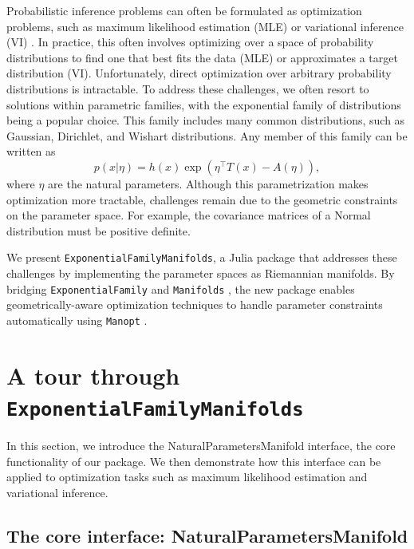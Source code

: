 \documentclass{juliacon}
\newcommand{\dmitry}[2][] {\todo[inline,backgroundcolor=teal!20!white, #1]{(dmitry) #2}}
\newcommand{\code}[1]{\textsf{#1}}
\begin{document}
Probabilistic inference problems can often be formulated as optimization problems, such as maximum likelihood estimation (MLE) or variational inference (VI) \cite{blei_variational_2017}. In practice, this often involves optimizing over a space of probability distributions to find one that best fits the data (MLE) or approximates a target distribution (VI). Unfortunately, direct optimization over arbitrary probability distributions is intractable. To address these challenges, we often resort to solutions within parametric families, with the exponential family of distributions being a popular choice. This family includes many common distributions, such as Gaussian, Dirichlet, and Wishart distributions. Any member of this family can be written as
\begin{equation*}\label{eq:exponential-family}
p(x|\eta) = h(x)\exp\left(\eta^\top T(x) - A(\eta)\right),
\end{equation*}
where $\eta$ are the natural parameters. Although this parametrization makes optimization more tractable, challenges remain due to the geometric constraints on the parameter space. For example, the covariance matrices of a Normal distribution must be positive definite.

We present \texttt{ExponentialFamilyManifolds}, a Julia \cite{bezanson2017julia} package that addresses these challenges by implementing the parameter spaces as Riemannian manifolds. By bridging \texttt{ExponentialFamily} \cite{Senoz_ExponentialFamily_jl_2023} and \texttt{Manifolds} \cite{axen_manifoldsjl_2023}, the new package enables geometrically-aware optimization techniques to handle parameter constraints automatically using \texttt{Manopt} \cite{bergmann_manoptjl_2022}.

\section{A tour through \texttt{ExponentialFamilyManifolds}}
In this section, we introduce the \code{NaturalParametersManifold} interface, the core functionality of our package. We then demonstrate how this interface can be applied to optimization tasks such as maximum likelihood estimation and variational inference.

\subsection{The core interface: \code{NaturalParametersManifold}}
\end{document}
